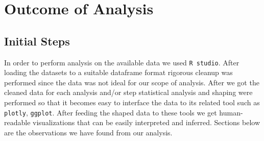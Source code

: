 \section{Outcome of Analysis}
\subsection{Initial Steps}
In order to perform analysis on the available data we used \verb|R studio|. After loading the datasets to a suitable dataframe format rigorous cleanup was performed since the data was not ideal for our scope of analysis. After we got the cleaned data for each analysis and/or step statistical analysis and shaping were performed so that it becomes easy to interface the data to its related tool such as \verb|plotly|, \verb|ggplot|. After feeding the shaped data to these tools we get human-readable visualizations that can be easily interpreted and inferred. Sections below are the observations we have found from our analysis.


